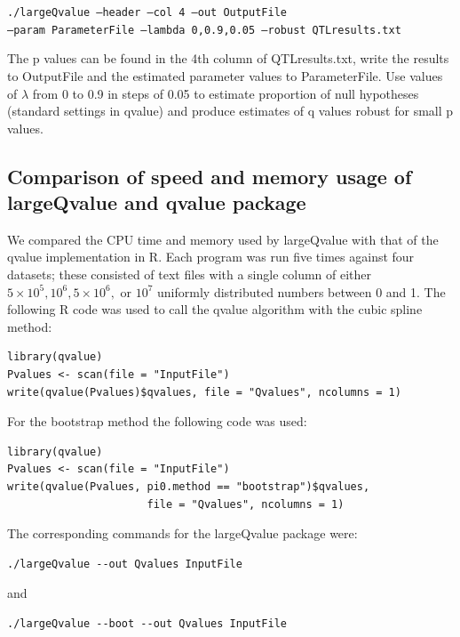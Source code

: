 \documentclass{amsart}
\begin{document}
\texttt{./largeQvalue --header --col 4 --out OutputFile\\ 
--param ParameterFile --lambda 0,0.9,0.05 --robust QTLresults.txt}

The p values can be found in the 4th column of QTLresults.txt, write the results to OutputFile and the estimated parameter values to ParameterFile. Use values of $\lambda$ from 0 to 0.9 in steps of 0.05 to estimate proportion of null hypotheses (standard settings in qvalue) and produce estimates of q values robust for small p values.

\subsection{Comparison of speed and memory usage of largeQvalue and qvalue package}
\label{sec:compare}

We compared the CPU time and memory used by largeQvalue with that of the qvalue implementation in R. Each program was run five times against four datasets; these consisted of text files with a single column of either $5\times10^5, 10^6, 5\times10^6,$ or $10^7$ uniformly distributed numbers between 0 and 1. The following R code was used to call the qvalue algorithm with the cubic spline method:

\begin{verbatim}
library(qvalue)
Pvalues <- scan(file = "InputFile")
write(qvalue(Pvalues)$qvalues, file = "Qvalues", ncolumns = 1)
\end{verbatim}

\noindent For the bootstrap method the following code was used:

\begin{verbatim}
library(qvalue)
Pvalues <- scan(file = "InputFile")
write(qvalue(Pvalues, pi0.method == "bootstrap")$qvalues,
                      file = "Qvalues", ncolumns = 1)
\end{verbatim}

\noindent The corresponding commands for the largeQvalue package were:

\begin{verbatim}
./largeQvalue --out Qvalues InputFile
\end{verbatim}

\noindent and

\begin{verbatim}
./largeQvalue --boot --out Qvalues InputFile
\end{verbatim}

\end{document}
